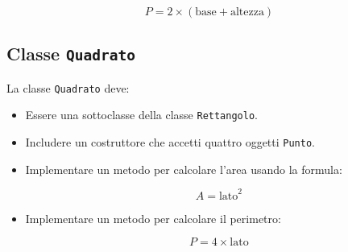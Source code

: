 \documentclass{article}
\begin{document}
\begin{multicols}{2}
\begin{itemize}
\[
P = 2 \times (\text{base} + \text{altezza})
\]

\end{itemize}

\subsection{Classe \texttt{Quadrato}}
La classe \texttt{Quadrato} deve:
\begin{itemize}
\item Essere una sottoclasse della classe \texttt{Rettangolo}.
\item Includere un costruttore che accetti quattro oggetti \texttt{Punto}.
\item Implementare un metodo per calcolare l'area usando la formula:

\[
A = \text{lato}^2
\]

    \item Implementare un metodo per calcolare il perimetro:

\[
P = 4 \times \text{lato}
\]
\end{itemize}

\end{multicols}
\end{document}
